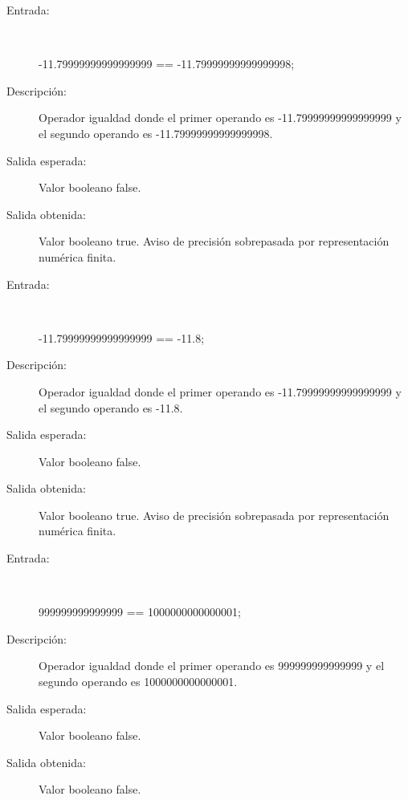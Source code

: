 	\begin{description}
		\item [Entrada:] \hfill \\
\begin{myverbatim}
 -11.79999999999999999 == -11.79999999999999998;
\end{myverbatim}
		\item [Descripción:] Operador igualdad donde el primer operando es -11.79999999999999999 y el segundo operando es  -11.79999999999999998.
		\item [Salida esperada:] Valor booleano false.
		\item [Salida obtenida:] Valor booleano true. Aviso de precisión sobrepasada por representación numérica finita.
	\end{description}

	\begin{description}
		\item [Entrada:] \hfill \\
\begin{myverbatim}
 -11.79999999999999999 == -11.8;
\end{myverbatim}
		\item [Descripción:] Operador igualdad donde el primer operando es -11.79999999999999999 y el segundo operando es  -11.8.
		\item [Salida esperada:] Valor booleano false.
		\item [Salida obtenida:] Valor booleano true. Aviso de precisión sobrepasada por representación numérica finita.
	\end{description}

	\begin{description}
		\item [Entrada:] \hfill \\
\begin{myverbatim}
 999999999999999 == 1000000000000001;
\end{myverbatim}
		\item [Descripción:] Operador igualdad donde el primer operando es 999999999999999 y el segundo operando es  1000000000000001.
		\item [Salida esperada:] Valor booleano false.
		\item [Salida obtenida:] Valor booleano false.
	\end{description}


